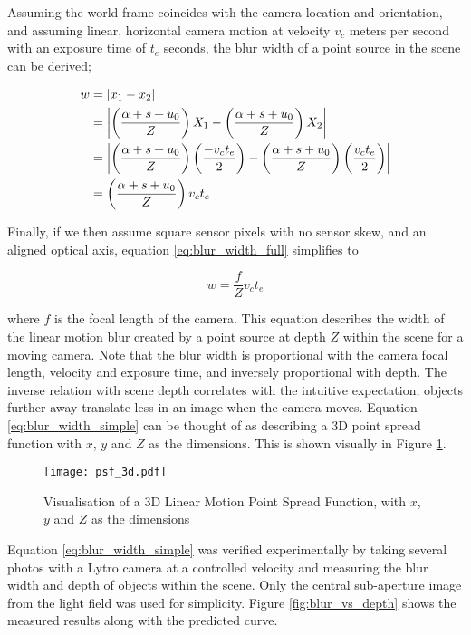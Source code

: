 Assuming the world frame coincides with the camera location and orientation, and assuming linear, horizontal camera motion at velocity $v_c$ meters per second with an exposure time of $t_e$ seconds, the blur width of a point source in the scene can be derived;

\begin{align}
w &= \left| x_1 - x_2 \right| \notag \\
&= \left| \left( \frac{\alpha + s + u_0}{Z} \right) X_1 - \left( \frac{\alpha + s + u_0}{Z} \right) X_2 \right| \notag \\
&= \left| \left( \frac{\alpha + s + u_0}{Z} \right) \left(\frac{- v_c t_e}{2}\right) - \left( \frac{\alpha + s + u_0}{Z} \right) \left(\frac{v_c t_e}{2}\right) \right| \notag \\
\label{eq:blur_width_full}
&= \left( \frac{\alpha + s + u_0}{Z} \right) v_c t_e
\end{align}

Finally, if we then assume square sensor pixels with no sensor skew, and an aligned optical axis, equation \ref{eq:blur_width_full} simplifies to

\begin{equation}
\label{eq:blur_width_simple}
w = \frac{f}{Z} v_c t_e
\end{equation}

\noindent
where $f$ is the focal length of the camera.
This equation describes the width of the linear motion blur created by a point source at depth $Z$ within the scene for a moving camera.
Note that the blur width is proportional with the camera focal length, velocity and exposure time, and inversely proportional with depth.
The inverse relation with scene depth correlates with the intuitive expectation; objects further away translate less in an image when the camera moves.
Equation \ref{eq:blur_width_simple} can be thought of as describing a 3D point spread function with $x$, $y$ and $Z$ as the dimensions.
This is shown visually in Figure \ref{fig:psf_3d}.


\begin{figure}[h]
\centering
\texttt{[image: psf\_3d.pdf]}
\caption[Visualisation of a 3D Point Spread Function]{Visualisation of a 3D Linear Motion Point Spread Function, with $x$, $y$ and $Z$ as the dimensions}
\label{fig:psf_3d}
\end{figure}

Equation \ref{eq:blur_width_simple} was verified experimentally by taking several photos with a Lytro camera at a controlled velocity and measuring the blur width and depth of objects within the scene.
Only the central sub-aperture image from the light field was used for simplicity.
Figure \ref{fig:blur_vs_depth} shows the measured results along with the predicted curve.

